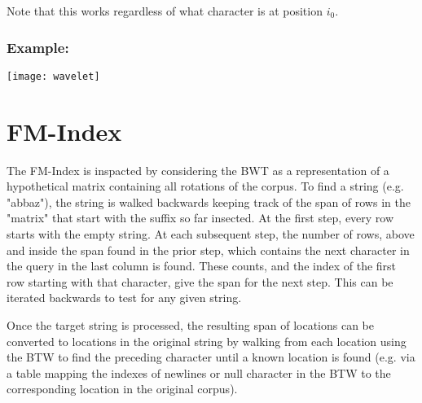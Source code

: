 \documentclass[12pt]{article}
\begin{document}
Note that this works regardless of what character is at position $i_0$.

\subsubsection{Example:}
\texttt{[image: wavelet]}

\section{FM-Index}

The FM-Index is inspacted by considering the BWT as a representation of a
 hypothetical matrix containing all rotations of the corpus.
To find a string (e.g. "abbaz"), the string is walked backwards keeping track of
 the span of rows in the "matrix" that start with the suffix so far insected.
At the first step, every row starts with the empty string.
At each subsequent step, the number of rows, above and inside the span found in
 the prior step, which contains the next character in the query in the last
 column is found.
These counts, and the index of the first row starting with that character, give
 the span for the next step.
This can be iterated backwards to test for any given string.

Once the target string is processed, the resulting span of locations can be
 converted to locations in the original string by walking from each location
 using the BTW to find the preceding character until a known location is found
 (e.g. via a table mapping the indexes of newlines or null character in the BTW
 to the corresponding location in the original corpus).
\end{document}
